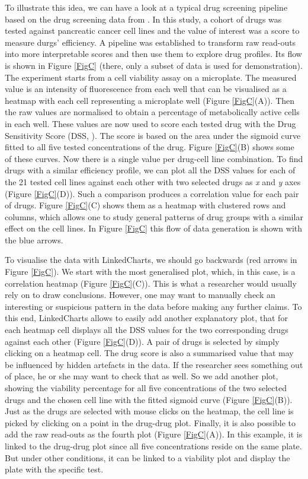 \documentclass[twocolumn,10pt]{article}
\begin{document}
To illustrate this idea, we can have a look at a typical drug screening pipeline based on the drug screening data from \citet{he_2018}. In this study, a cohort of drugs was tested against pancreatic cancer cell lines and the value of interest was a score to measure durgs' efficiency. A pipeline was established to transform raw read-outs into more interpretable scores and then use them to explore drug profiles. Its flow is shown in Figure \ref{FigC} (there, only a subset of data is used for demonstration). The experiment starts from a cell viability assay on a microplate. The measured value is an intensity of fluorescence from each well that can be visualised as a heatmap with each cell representing a microplate well (Figure \ref{FigC}(A)). Then the raw values are normalised to obtain a percentage of metabolically active cells in each well. These values are now used to score each tested drug with the Drug Sensitivity Score (DSS, \citep{yadav_2014}). The score is based on the area under the sigmoid curve fitted to all five tested concentrations of the drug. Figure \ref{FigC}(B) shows some of these curves. Now there is a single value per drug-cell line combination. To find drugs with a similar efficiency profile, we can plot all the DSS values for each of the 21 tested cell lines against each other with two selected drugs as \emph{x} and \emph{y} axes (Figure \ref{FigC}(D)). Such a comparison produces a correlation value for each pair of drugs. Figure \ref{FigC}(C) shows them as a heatmap with clustered rows and columns, which allows one to study general patterns of drug groups with a similar effect on the cell lines. In Figure \ref{FigC} this flow of data generation is shown with the blue arrows.

To visualise the data with LinkedCharts, we should go backwards (red arrows in Figure \ref{FigC}). We start with the most generalised plot, which, in this case, is a correlation heatmap (Figure \ref{FigC}(C)). This is what a researcher would usually rely on to draw conclusions. However, one may want to manually check an interesting or suspicious pattern in the data before making any further claims. To this end, LinkedCharts allows to easily add another explanatory plot, that for each heatmap cell displays all the DSS values for the two corresponding drugs against each other (Figure \ref{FigC}(D)). A pair of drugs is selected by simply clicking on a heatmap cell. The drug score is also a summarised value that may be influenced by hidden artefacts in the data. If the researcher sees something out of place, he or she may want to check that as well. So we add another plot, showing the viability percentage for all five concentrations of the two selected drugs and the chosen cell line with the fitted sigmoid curve (Figure \ref{FigC}(B)). Just as the drugs are selected with mouse clicks on the heatmap, the cell line is picked by clicking on a point in the drug-drug plot. Finally, it is also possible to add the raw read-outs as the fourth plot (Figure \ref{FigC}(A)). In this example, it is linked to the drug-drug plot since all five concentrations reside on the same plate. But under other conditions, it can be linked to a viability plot and display the plate with the specific test.
\end{document}
